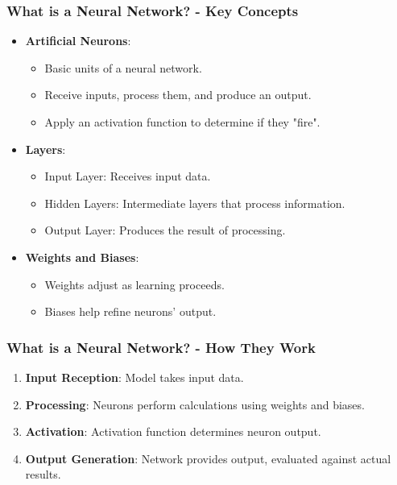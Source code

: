 \documentclass{beamer}
\begin{document}
\begin{frame}[fragile]
    \frametitle{What is a Neural Network? - Key Concepts}
    \begin{itemize}
        \item \textbf{Artificial Neurons}:
        \begin{itemize}
            \item Basic units of a neural network.
            \item Receive inputs, process them, and produce an output.
            \item Apply an activation function to determine if they "fire".
        \end{itemize}
        \item \textbf{Layers}:
        \begin{itemize}
            \item Input Layer: Receives input data.
            \item Hidden Layers: Intermediate layers that process information.
            \item Output Layer: Produces the result of processing.
        \end{itemize}
        \item \textbf{Weights and Biases}:
        \begin{itemize}
            \item Weights adjust as learning proceeds.
            \item Biases help refine neurons' output.
        \end{itemize}
    \end{itemize}
\end{frame}

\begin{frame}[fragile]
    \frametitle{What is a Neural Network? - How They Work}
    \begin{enumerate}
        \item \textbf{Input Reception}: Model takes input data.
        \item \textbf{Processing}: Neurons perform calculations using weights and biases.
        \item \textbf{Activation}: Activation function determines neuron output.
        \item \textbf{Output Generation}: Network provides output, evaluated against actual results.
    \end{enumerate}
\end{frame}
\end{document}
